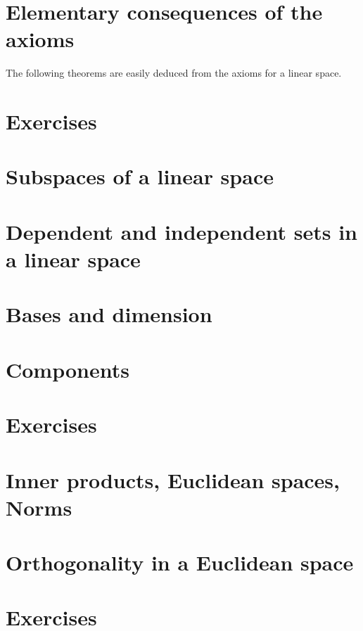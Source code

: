 \documentclass[cn,11pt,chinese]{elegantbook}
\numberwithin{equation}{section}
\begin{document}
\section{Elementary consequences of the axioms}
The following theorems are easily deduced from the axioms for a linear space.


\section{Exercises}



\section{Subspaces of a linear space}



\section{Dependent and independent sets in a linear space}


\section{Bases and dimension}



\section{Components}



\section{Exercises}



\section{Inner products, Euclidean spaces, Norms}



\section{Orthogonality in a Euclidean space}



\section{Exercises}
\end{document}

